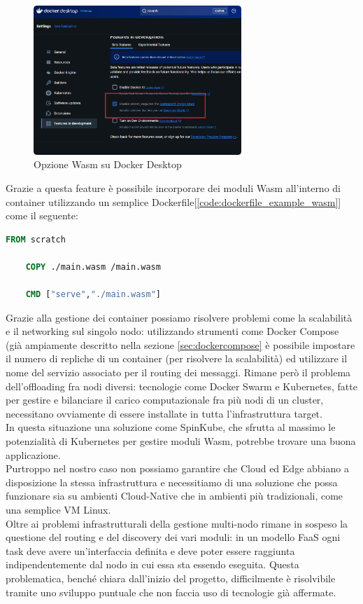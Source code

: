 \FloatBarrier
\begin{figure}[h]
    \centering
    \includegraphics[width=0.7\textwidth]{img/wasm_docker_desktop.png}
    \caption{Opzione Wasm su Docker Desktop}
    \label{fig:docker_desktop}
\end{figure}
\FloatBarrier

Grazie a questa feature è possibile incorporare dei moduli Wasm all'interno di container utilizzando un semplice Dockerfile[\ref{code:dockerfile_example_wasm}] come il seguente:
\begin{lstlisting}[language=Dockerfile, caption={Esempio Dockerfile per modulo Wasm}, captionpos=b, label={code:dockerfile_example_wasm}]
    FROM scratch
    
    COPY ./main.wasm /main.wasm
    
    CMD ["serve","./main.wasm"]
\end{lstlisting}
Grazie alla gestione dei container possiamo risolvere problemi come la scalabilità e il networking sul singolo nodo: utilizzando strumenti come Docker Compose (già ampiamente descritto nella sezione \ref{sec:dockercompose} è possibile impostare il numero di repliche di un container (per risolvere la scalabilità) ed utilizzare il nome del servizio associato per il routing dei messaggi. Rimane però il problema dell'offloading fra nodi diversi: tecnologie come Docker Swarm e Kubernetes, fatte per gestire e bilanciare il carico computazionale fra più nodi di un cluster, necessitano ovviamente di essere installate in tutta l'infrastruttura target.\\
In questa situazione una soluzione come SpinKube, che sfrutta al massimo le potenzialità di Kubernetes per gestire moduli Wasm, potrebbe trovare una buona applicazione.\\
Purtroppo nel nostro caso non possiamo garantire che Cloud ed Edge abbiano a disposizione la stessa infrastruttura e necessitiamo di una soluzione che possa funzionare sia su ambienti Cloud-Native che in ambienti più tradizionali, come una semplice VM Linux.\\
Oltre ai problemi infrastrutturali della gestione multi-nodo rimane in sospeso la questione del routing e del discovery dei vari moduli: in un modello FaaS ogni task deve avere un'interfaccia definita e deve poter essere raggiunta indipendentemente dal nodo in cui essa sta essendo eseguita. Questa problematica, benché chiara dall'inizio del progetto, difficilmente è risolvibile tramite uno sviluppo puntuale che non faccia uso di tecnologie già affermate.

